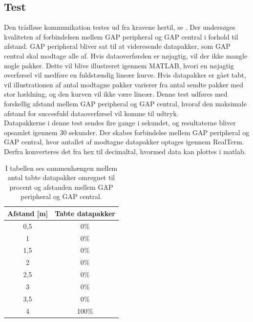 
\subsection{Test}
Den trådløse kommunikation testes ud fra kravene hertil, se . Der undersøges kvaliteten af forbindelsen mellem GAP peripheral og GAP central i forhold til afstand. GAP peripheral bliver sat til at videresende datapakker, som GAP central skal modtage alle af. Hvis dataoverførslen er nøjagtig, vil der ikke mangle nogle pakker. Dette vil blive illustreret igennem MATLAB, hvori en nøjagtig overførsel vil medføre en fuldstændig lineær kurve. Hvis datapakker er gået tabt, vil illustrationen af antal modtagne pakker varierer fra antal sendte pakker med stor hældning, og den kurven vil ikke være lineær. Denne test udføres med forskellig afstand mellem GAP peripheral og GAP central, hvoraf den maksimale afstand for succesfuld dataoverførsel vil komme til udtryk. \\
Datapakkerne i denne test sendes fire gange i sekundet, og resultaterne bliver opsamlet igennem 30 sekunder. Der skabes forbindelse mellem GAP peripheral og GAP central, hvor antallet af modtagne datapakker optages igennem RealTerm. Derfra konverteres det fra hex til decimaltal, hvormed data kan plottes i matlab.
\begin{table}[H]
	\centering
	\begin{tabular}{cc}
			\hline
		\rowcolor[HTML]{C0C0C0} 
		Afstand {[}m{]} & Tabte datapakker \\ 	\hline
		0,5 	& 0\% \\ 	\hline
		1 		& 0\% \\	\hline
		1,5 	& 0\% \\	\hline
		2 		& 0\% \\	\hline
		2,5 	& 0\% \\	\hline
		3 		& 0\% \\	\hline
		3,5 	& 0\% \\	\hline
		4 		& 100\% \\	\hline
	\end{tabular}
	\caption{I tabellen ses sammenhængen mellem antal tabte datapakker omregnet til procent og afstanden mellem GAP peripheral og GAP central.}
	\label{test:ble_overforsel}
\end{table} \vspace{-.5cm}
